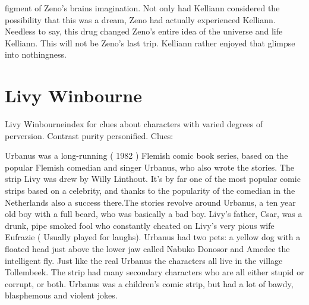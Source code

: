 \documentclass[12pt]{book}
\begin{document}
figment of Zeno's brains imagination. Not only had Kelliann considered the possibility that this was a dream, Zeno had actually experienced Kelliann. Needless to say, this drug changed Zeno's entire idea of the universe and life Kelliann. This will not be Zeno's last trip. Kelliann rather enjoyed that glimpse into nothingness.



\chapter{Livy Winbourne}

Livy Winbourneindex for clues about characters with varied degrees of perversion. Contrast purity personified. Clues:



Urbanus was a long-running ( 1982 ) Flemish comic book series, based on the popular Flemish comedian and singer Urbanus, who also wrote the stories. The strip Livy was drew by Willy Linthout. It's by far one of the most popular comic strips based on a celebrity, and thanks to the popularity of the comedian in the Netherlands also a success there.The stories revolve around Urbanus, a ten year old boy with a full beard, who was basically a bad boy. Livy's father, Csar, was a drunk, pipe smoked fool who constantly cheated on Livy's very pious wife Eufrazie ( Usually played for laughs). Urbanus had two pets: a yellow dog with a floated head just above the lower jaw called Nabuko Donosor and Amedee the intelligent fly. Just like the real Urbanus the characters all live in the village Tollembeek. The strip had many secondary characters who are all either stupid or corrupt, or both. Urbanus was a children's comic strip, but had a lot of bawdy, blasphemous and violent jokes.
\end{document}
